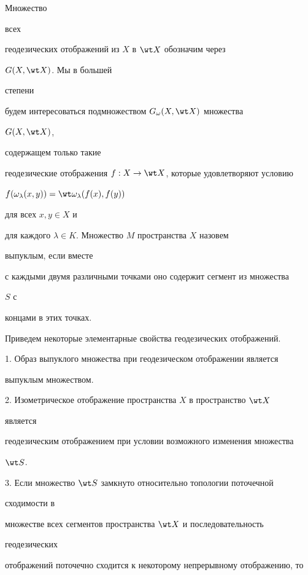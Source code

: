 Множество 


всех 


геодезических отображений из $X$ в $\wt X$ обозначим через 


$G(X,\wt X)$. Мы в большей 


степени 


будем интересоваться подмножеством $G_{\omega}(X,\wt X)$ множества 


$G(X,\wt X)$, 


содержащем только такие 


геодезические отображения $f:X\to\wt X$, которые удовлетворяют условию


$f(\omega_{\lambda}(x,y))=\wt\omega_{\lambda}(f(x),f(y))$ 


для всех $x,y\in X$ и 


для каждого $\lambda\in K$. Множество $M$ пространства $X$ назовем 


выпуклым, если вместе 


с каждыми двумя различными точками оно содержит сегмент из множества 


$S$ с 


концами в этих точках. 


 


Приведем некоторые элементарные свойства геодезических отображений. 


 


1. Образ выпуклого множества при геодезическом отображении является 


выпуклым множеством. 


 


2. Изометрическое отображение пространства $X$ в пространство $\wt X$ 


является 


геодезическим отображением при условии возможного изменения множества 


$\wt S$. 


 


3. Если множество $\wt S$ замкнуто относительно топологии поточечной 


сходимости в 


множестве всех сегментов пространства $\wt X$ и последовательность 


геодезических 


отображений поточечно сходится к некоторому непрерывному отображению, то 


